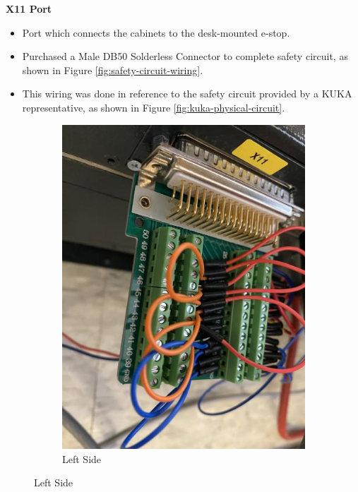 \documentclass[12pt, letterpaper]{article}
\begin{document}
\textbf{X11 Port}
\begin{itemize}
    \item Port which connects the cabinets to the desk-mounted e-stop. 
    \item Purchased a Male DB50 Solderless Connector to complete safety circuit, as shown in Figure \ref{fig:safety-circuit-wiring}.
    \item This wiring was done in reference to the safety circuit provided by a KUKA representative, as shown in Figure \ref{fig:kuka-physical-circuit}.
\end{itemize}

\begin{figure}
    \centering
    \begin{subfigure}[b]{0.32\textwidth}
        \centering
        \includegraphics[width=\textwidth]{Images/IMG_1578.jpg}
        \caption{Left Side}
        \label{fig:safcl}
    \end{subfigure}
    \hfill

\end{figure}
\end{document}
